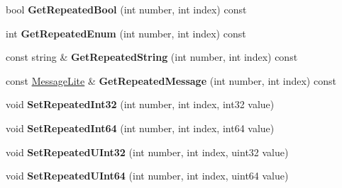 \begin{DoxyCompactItemize}
bool {\bfseries Get\+Repeated\+Bool} (int number, int index) const
\item 
\mbox{\label{classgoogle_1_1protobuf_1_1internal_1_1ExtensionSet_ac65f05a12d67784dc1e181a0c1771244}} 
int {\bfseries Get\+Repeated\+Enum} (int number, int index) const
\item 
\mbox{\label{classgoogle_1_1protobuf_1_1internal_1_1ExtensionSet_ab879fd02ad9d81b5ef65f2d70e45e9f5}} 
const string \& {\bfseries Get\+Repeated\+String} (int number, int index) const
\item 
\mbox{\label{classgoogle_1_1protobuf_1_1internal_1_1ExtensionSet_a3abb2073d8934e8ac1ac126021b13580}} 
const \hyperlink{classgoogle_1_1protobuf_1_1MessageLite}{Message\+Lite} \& {\bfseries Get\+Repeated\+Message} (int number, int index) const
\item 
\mbox{\label{classgoogle_1_1protobuf_1_1internal_1_1ExtensionSet_a105d9829479360749a776fc82b7fbe5c}} 
void {\bfseries Set\+Repeated\+Int32} (int number, int index, int32 value)
\item 
\mbox{\label{classgoogle_1_1protobuf_1_1internal_1_1ExtensionSet_a1b4bf39e5ac83c4d45a7a9519319d76b}} 
void {\bfseries Set\+Repeated\+Int64} (int number, int index, int64 value)
\item 
\mbox{\label{classgoogle_1_1protobuf_1_1internal_1_1ExtensionSet_a0b7fecdd70922f145cfeb6a27edc522e}} 
void {\bfseries Set\+Repeated\+U\+Int32} (int number, int index, uint32 value)
\item 
\mbox{\label{classgoogle_1_1protobuf_1_1internal_1_1ExtensionSet_ac7d86b888dab087e5e214df87775fe4f}} 
void {\bfseries Set\+Repeated\+U\+Int64} (int number, int index, uint64 value)
\item 
\mbox{\label{classgoogle_1_1protobuf_1_1internal_1_1ExtensionSet_ab67442f7fc68abd6547115123f7ca968}} 

\end{DoxyCompactItemize}
